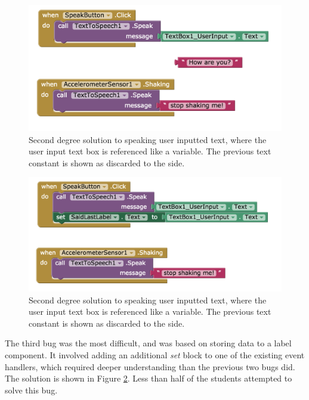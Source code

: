 \begin{figure}
  \centering
      \includegraphics[width=\textwidth]{images/debugActivity/debug2input}
  \caption[Second degree solution to speaking user inputted text]{Second degree solution to speaking user inputted text, where the user input text box is referenced like a variable. The previous text constant is shown as discarded to the side.}
  \label{fig:debug2}
\end{figure}

\begin{figure}
  \centering
      \includegraphics[width=\textwidth]{images/debugActivity/debug3saidlast}
  \caption[Second degree solution to speaking user inputted text]{Second degree solution to speaking user inputted text, where the user input text box is referenced like a variable. The previous text constant is shown as discarded to the side.}
  \label{fig:debug3}
\end{figure}

The third bug was the most difficult, and was based on storing data to a label component. It involved adding an additional \emph{set} block to one of the existing event handlers, which required deeper understanding than the previous two bugs did. The solution is shown in Figure \ref{fig:debug3}. Less than half of the students attempted to solve this bug.


